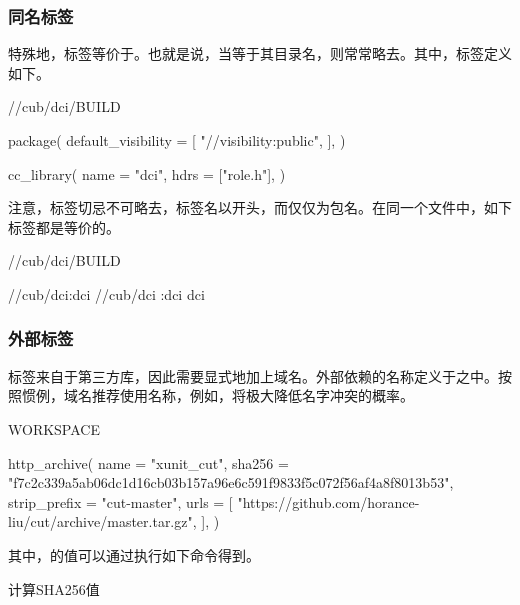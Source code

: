 \begin{content}
\subsubsection{同名标签}

特殊地，标签等价于。也就是说，当等于其目录名，则常常略去。其中，标签定义如下。

\begin{nodiff}{//cub/dci/BUILD}
 \begin{python}
package(
    default_visibility = [    
        "//visibility:public",    
    ],
)

cc_library(
    name = "dci",
    hdrs = ["role.h"],
)
 \end{python}
\end{nodiff}

注意，标签切忌不可略去\ascii{//}，标签名以\ascii{//}开头，而仅仅为包名。在同一个文件中，如下标签都是等价的。

\begin{nodiff}{//cub/dci/BUILD}
 \begin{python}
//cub/dci:dci
//cub/dci
:dci
dci
 \end{python}
\end{nodiff}

\subsubsection{外部标签}

标签来自于第三方库，因此需要显式地加上域名。外部依赖的名称定义于之中。按照惯例，域名推荐使用名称，例如，将极大降低名字冲突的概率。

\begin{nodiff}{WORKSPACE}
 \begin{python}
http_archive(
    name = "xunit_cut",
    sha256 = "f7c2c339a5ab06dc1d16cb03b157a96e6c591f9833f5c072f56af4a8f8013b53",
    strip_prefix = "cut-master",
    urls = [
        "https://github.com/horance-liu/cut/archive/master.tar.gz",
    ],
)
 \end{python}
\end{nodiff}

其中，的值可以通过执行如下命令得到。

\begin{nodiff}{计算SHA256值}
\end{nodiff}


\end{content}
